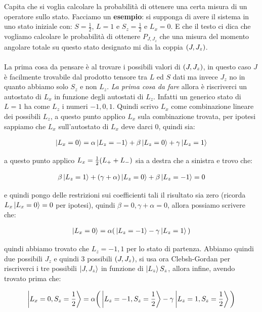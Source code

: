 	Capita che si voglia calcolare la probabilità di ottenere una certa misura di un operatore sullo stato. Facciamo un \textbf{esempio}: si supponga di avere il sistema in uno stato iniziale con: $S = \frac{1}{2}$, $L = 1$ e $S_z = \frac{1}{2}$ e $L_x = 0$. E che il testo ci dica che vogliamo calcolare le probabilità di ottenere $P_{J, J_z}$ che una misura del momento angolare totale su questo stato designato mi dia la coppia $\qty(J, J_z)$.
	\\
	\\
	La prima cosa da pensare è al trovare i possibili valori di $\qty(J, J_z)$, in questo caso $J$ è facilmente trovabile dal prodotto tensore tra $L$ ed $S$ dati ma invece $J_z$ no in quanto abbiamo solo $S_z$ e non $L_z$. \textit{La prima cosa da fare} allora è riscriverci un autostato di $L_x $ in funzione degli autostati di $L_z$. Infatti un generico stato di $L = 1$ ha come $L_z$ i numeri $-1, 0, 1$. Quindi scrivo $L_x$ come combinazione lineare dei possibili $L_z$, a questo punto applico $L_x$ sula combinazione trovata, per ipotesi sappiamo che $L_x$ sull'autostato di $L_x$ deve darci $0$, quindi sia:
	
\begin{align*}
	\ket{L_x = 0} = \alpha \ket{L_z = -1 } + \beta \ket{L_z = 0} + \gamma \ket{L_z = 1 }
\end{align*}

	a questo punto applico $L_x = \frac{1}{2} \qty(L_+ + L_-)$ sia a destra che a sinistra e trovo che:
	
\begin{align*}
	\beta \ket{L_z = 1} + \qty(\gamma + \alpha )\ket{L_z = 0} + \beta \ket{L_z = -1} = 0
\end{align*}

	e quindi pongo delle restrizioni sui coefficienti tali il risultato sia zero (ricorda $L_x \ket{L_x = 0} = 0$ per ipotesi), quindi $	\beta = 0, \gamma + \alpha = 0$, allora possiamo scrivere che:
	
\begin{align*}
	\ket{L_x = 0} = \alpha \qty(\, \ket{L_z = -1 } - \gamma \ket{L_z = 1 }\,) 
\end{align*}
 
	quindi abbiamo trovato che $L_z = - 1, 1$ per lo stato di partenza. Abbiamo quindi due possibili $J_z$ e quindi $3$ possibili $\qty(J, J_z)$, si usa ora Clebsh-Gordan per riscriverci i tre possibili $\ket{J, J_z}$ in funzione di $\ket{L_z}{S_z}$, allora infine, avendo trovato prima che:
	
\begin{align*}
	\ket{L_x = 0, S_z = \frac{1}{2}} = \alpha \qty( \, \ket{L_z = -1, S_z = \frac{1}{2} } - \gamma \ket{L_z = 1, S_z = \frac{1}{2} }\,) 
\end{align*}
	
